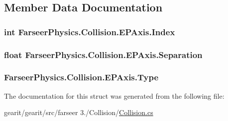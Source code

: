 \subsection{Member Data Documentation}
\hypertarget{struct_farseer_physics_1_1_collision_1_1_e_p_axis_a120e07624033c34974e00281a684f263}{
\subsubsection[{Index}]{\setlength{\rightskip}{0pt plus 5cm}int Farseer\+Physics.\+Collision.\+E\+P\+Axis.\+Index}}\label{struct_farseer_physics_1_1_collision_1_1_e_p_axis_a120e07624033c34974e00281a684f263}
\hypertarget{struct_farseer_physics_1_1_collision_1_1_e_p_axis_af41da094cfbb8817d6d0e72253af079e}{
\subsubsection[{Separation}]{\setlength{\rightskip}{0pt plus 5cm}float Farseer\+Physics.\+Collision.\+E\+P\+Axis.\+Separation}}\label{struct_farseer_physics_1_1_collision_1_1_e_p_axis_af41da094cfbb8817d6d0e72253af079e}
\hypertarget{struct_farseer_physics_1_1_collision_1_1_e_p_axis_a02e60bdfbcca3011b702fb283d53412e}{
\subsubsection[{Type}]{ Farseer\+Physics.\+Collision.\+E\+P\+Axis.\+Type}}\label{struct_farseer_physics_1_1_collision_1_1_e_p_axis_a02e60bdfbcca3011b702fb283d53412e}


The documentation for this struct was generated from the following file\+:\begin{DoxyCompactItemize}
\item 
gearit/gearit/src/farseer 3./\+Collision/\hyperlink{_collision_8cs}{Collision.\+cs}\end{DoxyCompactItemize}
